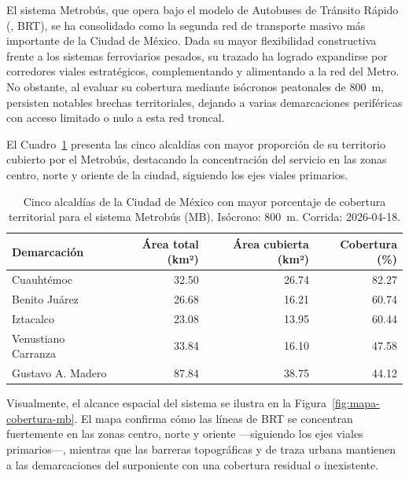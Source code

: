 El sistema Metrobús, que opera bajo el modelo de Autobuses de Tránsito Rápido
(, BRT), se ha consolidado como la segunda red de
transporte masivo más importante de la Ciudad de México. Dada su mayor flexibilidad
constructiva frente a los sistemas ferroviarios pesados, su trazado ha logrado
expandirse por corredores viales estratégicos, complementando y alimentando a la
red del Metro. No obstante, al evaluar su cobertura mediante isócronos peatonales
de 800~m, persisten notables brechas territoriales, dejando a varias demarcaciones
periféricas con acceso limitado o nulo a esta red troncal.

El Cuadro~\ref{tab:cobertura-mb-cdmx} presenta las cinco alcaldías con mayor
proporción de su territorio cubierto por el Metrobús, destacando la concentración
del servicio en las zonas centro, norte y oriente de la ciudad, siguiendo los ejes
viales primarios.

\begin{table}[H]
    \centering
    \caption[Alcaldías con mayor cobertura de Metrobús (CDMX)]{
    Cinco alcaldías de la Ciudad de México con mayor porcentaje de cobertura
    territorial para el sistema Metrobús (MB). Isócrono: 800~m.
    Corrida: 2026-04-18.}
    \label{tab:cobertura-mb-cdmx}
    \begin{tabular}{|l|r|r|r|}
        \hline
        \textbf{Demarcación} & \textbf{Área total (km²)} & \textbf{Área cubierta (km²)} & \textbf{Cobertura (\%)} \\
        \hline
        Cuauhtémoc          & 32.50 &  26.74 &  82.27 \\
        Benito Juárez       & 26.68 &  16.21 &  60.74 \\
        Iztacalco           & 23.08 &  13.95 &  60.44 \\
        Venustiano Carranza & 33.84 &  16.10 &  47.58 \\
        Gustavo A. Madero   & 87.84 &  38.75 &  44.12 \\
        \hline
    \end{tabular}
\end{table}

Visualmente, el alcance espacial del sistema se ilustra en la
Figura~\ref{fig:mapa-cobertura-mb}. El mapa confirma cómo las líneas de BRT se
concentran fuertemente en las zonas centro, norte y oriente —siguiendo los ejes
viales primarios—, mientras que las barreras topográficas y de traza urbana
mantienen a las demarcaciones del surponiente con una cobertura residual o
inexistente.

